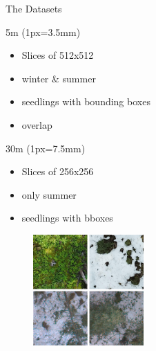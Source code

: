 \documentclass[aspectratio=43]{beamer}
\begin{document}
\begin{frame}{The Datasets}
	\bigskip\bigskip\bigskip\bigskip\bigskip\bigskip
		
	\begin{block}{5m (1px=3.5mm)}
	\begin{itemize}
		\item Slices of 512x512 
		\item winter \& summer
		\item seedlings with bounding boxes
		\item overlap
	
	\end{itemize}		
	\end{block}
	
		\begin{block}{30m (1px=7.5mm)}
	\begin{itemize}
		\item Slices of 256x256
		\item only summer
		\item seedlings with bboxes
	\end{itemize}		
	\end{block}
	\endminipage\hfill
		\begin{figure}
			\includegraphics[height= 160]{img/dataset.png}
			
		\end{figure}	

	\endminipage\hfill
\end{frame}
\end{document}
